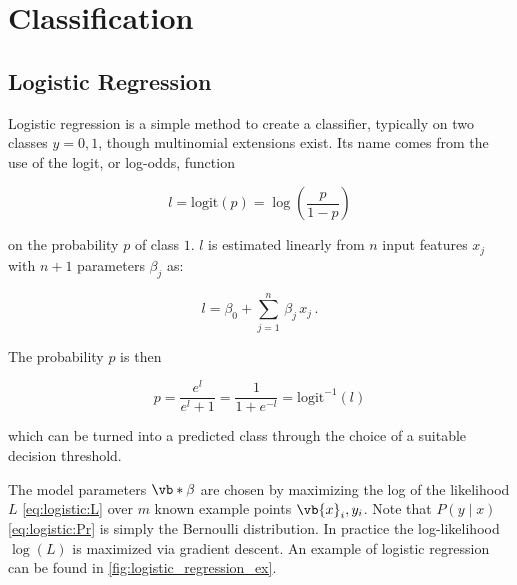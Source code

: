 \chapter{Classification}
\label{chap:class}

\section{Logistic Regression}
\label{class:logistic}

Logistic regression is a simple method to create a classifier,
typically on two classes $y = 0,1$, though multinomial extensions exist.
Its name comes from the use of the logit, or log-odds, function

\begin{equation}\label{eq:logistic:logic}
l = \text{logit}\left(p\right) = \log\left(\frac{p}{1-p}\right)
\end{equation}

\noindent on the probability $p$ of class $1$.
$l$ is estimated linearly from $n$ input features $x_{j}$ with $n+1$ parameters $\beta_{j}$ as:

\begin{equation}\label{eq:logistic:logicBeta}
l = \beta_{0} + \sum_{j=1}^{n} \, \beta_{j}\,x_{j}\,.
\end{equation}

\noindent The probability $p$ is then

\begin{equation}\label{eq:logistic:p}
p = \frac{e^l}{e^l + 1} = \frac{1}{1+e^{-l}} = \text{logit}^{-1}\left(l\right)
\end{equation}

\noindent which can be turned into a predicted class through the choice of a suitable decision threshold.

The model parameters $\vb*{\beta}$ are chosen by maximizing
the log of the likelihood $L$ \cref{eq:logistic:L} over $m$ known example points $\vb{x}_{i}, y_{i}$.
Note that $P\left(y \mid x\right)$ \cref{eq:logistic:Pr} is simply the Bernoulli distribution.
In practice the log-likelihood $\log\left(L\right)$ is maximized via gradient descent.
An example of logistic regression can be found in \cref{fig:logistic_regression_ex}.

